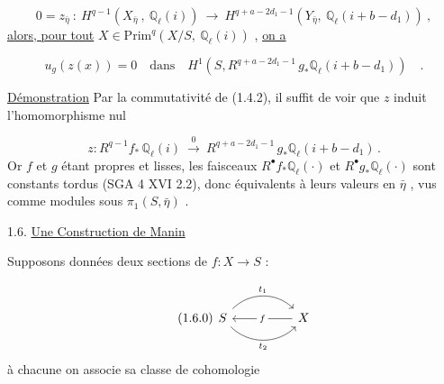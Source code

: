 \begin{equation}\tag{1.5.3}
0 = z_{\bar{\eta}} \ : \ H^{q-1}(X_{\bar{\eta}} \ , \ \mathbb{Q}_\ell(i)) \ \longrightarrow \ H^{q+a-2d_1-1}(Y_{\bar{\eta}}, \ \mathbb{Q}_\ell(i+b-d_1)) \ ,
\end{equation}
\underline{alors, pour tout} $X \in \mathrm{Prim}^{q}(X/S,\ \mathbb{Q}_\ell(i))$ , \underline{on a}

\begin{equation}\tag{1.5.4}
u_g(z(x)) = 0 \quad \mathrm{dans} \quad H^{1}(S, R^{q+a-2d_1-1}\,g_*\mathbb{Q}_\ell(i+b-d_1)) \quad .
\end{equation}


\underline{Démonstration} Par la commutativité de (1.4.2), il suffit de voir que $z$ induit l'homomorphisme nul

\begin{equation}\tag{1.5.5}
z : R^{q-1}f_*\,\mathbb{Q}_\ell(i) \ \stackrel{0}{\longrightarrow} \ R^{q+a-2d_1-1}\,g_*\mathbb{Q}_\ell(i+b-d_1)\,.
\end{equation}
Or $f$ et $g$ étant propres et lisses, les faisceaux $R^{\bullet}f_*\mathbb{Q}_\ell(\cdot)$ et $R^{\bullet}g_*\mathbb{Q}_\ell(\cdot)$ sont constants tordus (SGA 4 XVI 2.2), donc équivalents à leurs valeurs en $\bar{\eta}$ , vus comme modules sous $\pi_1(S, \bar{\eta})$ .

1.6. \underline{Une Construction de Manin}

Supposons données deux sections de $f : X \longrightarrow S$ :

\begin{equation}\tag{1.6.0}
\begin{tikzcd}[column sep=huge]
S \arrow[r, bend left=45, "t_1"] \arrow[r, bend right=45, "t_2"'] & X \arrow[l, "f" description]
\end{tikzcd}
\end{equation}
à chacune on associe sa classe de cohomologie

